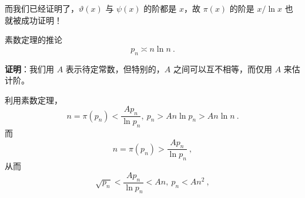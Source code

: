 而我们已经证明了，$\vartheta(x)$ 与 $\psi(x)$ 的阶都是 $x$，故 $\pi(x)$ 的阶是 $x/\ln x$ 也就被成功证明！

\begin{corollary}{素数定理的推论}
\begin{equation}
p_n \asymp n \ln n ~.
\end{equation}
\end{corollary}
\textbf{证明}：我们用 $A$ 表示待定常数，但特别的，$A$ 之间可以互不相等，而仅用 $A$ 来估计阶。

利用素数定理，
\begin{equation}
n = \pi(p_n) < \frac{A p_n}{\ln p_n}, ~ p_n > An\ln p_n > An \ln n ~.
\end{equation}
而
\begin{equation}
n = \pi(p_n) > \frac{Ap_n}{\ln p_n} ~,
\end{equation}
从而
\begin{equation}
\sqrt{p_n} < \frac{A p_n}{\ln p_n} < A n, ~ p_n < A n^2 ~,
\end{equation}





